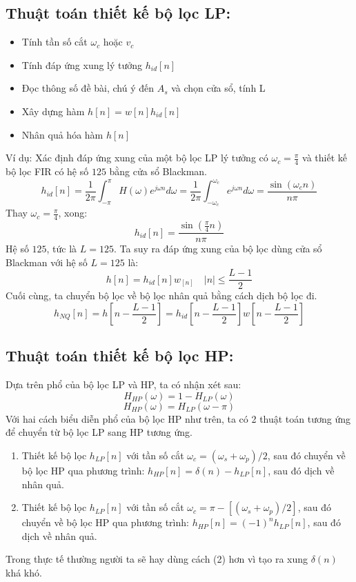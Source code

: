 \documentclass{article}
\begin{document}
\subsection{Thuật toán thiết kế bộ lọc LP:}
\begin{itemize}
  \item Tính tần số cắt $\omega_{c}$ hoặc $v_{c}$
  \item Tính đáp ứng xung lý tưởng $h_{id}[n]$
  \item Đọc thông số đề bài, chú ý đến $A_{s}$ và chọn cửa sổ, tính L
  \item Xây dựng hàm $h[n]=w[n]h_{id}[n]$
  \item Nhân quả hóa hàm $h[n]$
\end{itemize}
Ví dụ: Xác định đáp ứng xung của một bộ lọc LP lý tưởng có $\omega_{c}=\frac{\pi}{4}$ và thiết
kế bộ lọc FIR có hệ số $125$ bằng cửa sổ Blackman.
$$h_{id}[n]=\frac{1}{2\pi}\int_{-\pi}^{\pi}H(\omega)e^{j\omega n}d\omega=\frac{1}{2\pi}\int_{-\omega_{c}}^{\omega_{c}}e^{j\omega n}d\omega=\frac{\sin(\omega_{c}n)}{n\pi}$$
Thay $\omega_{c}=\frac{\pi}{4}$, xong:
$$h_{id}[n]=\frac{\sin({\frac{\pi}{4}n})}{n\pi}$$
Hệ số $125$, tức là $L=125$. Ta suy ra đáp ứng xung của bộ lọc dùng cửa sổ Blackman với hệ số $L=125$ là:
$$h[n]=h_{id}[n]w_[n] \quad |n|\leq\frac{L-1}{2}$$
Cuối cùng, ta chuyển bộ lọc về bộ lọc nhân quả bằng cách dịch bộ lọc đi.
$$h_{NQ}[n]=h\left[n-\frac{L-1}{2}\right]=h_{id}\left[n-\frac{L-1}{2}\right]w\left[n-\frac{L-1}{2}\right]$$
\subsection{Thuật toán thiết kế bộ lọc HP:}
Dựa trên phổ của bộ lọc LP và HP, ta có nhận xét sau:
\begin{equation}
  H_{HP}(\omega)=1-H_{LP}(\omega)
\end{equation}
\begin{equation}
  H_{HP}(\omega)=H_{LP}(\omega-\pi)
\end{equation}
Với hai cách biểu diễn phổ của bộ lọc HP như trên, ta có 2 thuật toán tương ứng để chuyển từ bộ lọc LP sang HP tương ứng.
\begin{enumerate}
  \item Thiết kế bộ lọc $h_{LP}[n]$ với tần số cắt $\omega_{c}=(\omega_{s}+\omega_{p})/2$, sau đó chuyển về bộ lọc HP qua phương trình:
  $h_{HP}[n]=\delta(n)-h_{LP}[n]$, sau đó dịch về nhân quả.
  \item Thiết kế bộ lọc $h_{LP}[n]$ với tần số cắt $\omega_{c}=\pi-[(\omega_{s}+\omega_{p})/2]$, sau đó chuyển về bộ lọc HP qua phương trình:
$h_{HP}[n]=(-1)^n h_{LP}[n]$, sau đó dịch về nhân quả.
\end{enumerate}
Trong thực tế thường người ta sẽ hay dùng cách (2) hơn vì tạo ra xung $\delta(n)$ khá khó.
\end{document}
